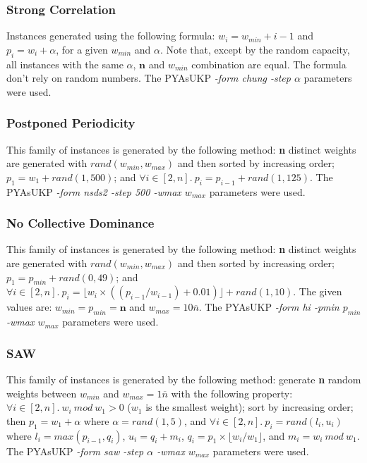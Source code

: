 \documentclass[runningheads,a4paper]{llncs}
\begin{document}
\subsubsection{Strong Correlation}
Instances generated using the following formula: \(w_i = w_{min} + i - 1\) and \(p_i = w_i + \alpha\), for a given \(w_{min}\) and \(\alpha\).  Note that, except by the random capacity, all instances with the same \(\alpha\), \(\mathbf{n}\) and \(w_{min}\) combination are equal. The formula don't rely on random numbers. The PYAsUKP \emph{-form chung -step \(\alpha\) } parameters were used.

\subsubsection{Postponed Periodicity}
This family of instances is generated by the following method: \textbf{n} distinct weights are generated with \(rand(w_{min}, w_{max})\) and then sorted by increasing order; \(p_1 = w_1 + rand(1, 500)\); and \(\forall i \in [2, n].~p_i = p_{i-1} + rand(1, 125)\). The PYAsUKP \emph{-form nsds2 -step 500 -wmax \(w_{max}\)} parameters were used.

\subsubsection{No Collective Dominance}
This family of instances is generated by the following method: \textbf{n} distinct weights are generated with \(rand(w_{min}, w_{max})\) and then sorted by increasing order; \(p_1 = p_{min} + rand(0, 49)\); and \(\forall i \in [2, n].~p_i = \lfloor w_i \times ((p_{i-1}/w_{i-1}) + 0.01)\rfloor + rand(1, 10)\). The given values are: \(w_{min} = p_{min} = \mathbf{n}\) and \(w_{max} = 10\overline{n}\). The PYAsUKP \emph{-form hi -pmin \(p_{min}\) -wmax \(w_{max}\)} parameters were used.

\subsubsection{SAW}
This family of instances is generated by the following method: generate \textbf{n} random weights between \(w_{min}\) and \(w_{max} = 1\overline{n}\) with the following property: \(\forall i \in [2, n].~w_i~mod~w_1 > 0\) (\(w_1\) is the smallest weight); sort by increasing order; then \(p_1 = w_1 + \alpha\) where \(\alpha = rand(1,5)\), and \(\forall i \in [2, n].~p_i = rand(l_i, u_i)\) where \(l_i = max(p_{i-1}, q_i)\), \(u_i = q_i + m_i\), \(q_i = p_1 \times \lfloor w_i / w_1 \rfloor \), and \(m_i = w_i~mod~w_1\). The PYAsUKP \emph{-form saw -step \(\alpha\) -wmax \(w_{max}\)} parameters were used.
\end{document}
